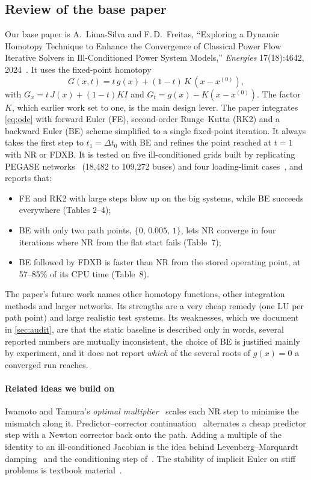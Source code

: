 \documentclass[sigconf,nonacm]{acmart}
\newcommand{\xo}{x^{(0)}}
\begin{document}
\subsection{Review of the base paper}\label{sec:basepaper}
Our base paper is A.~Lima-Silva and F.\,D.~Freitas, ``Exploring a Dynamic Homotopy Technique to Enhance
the Convergence of Classical Power Flow Iterative Solvers in Ill-Conditioned Power System Models,''
\emph{Energies} 17(18):4642, 2024~\cite{lima2024}. It uses the fixed-point homotopy
\begin{equation}
  G(x,t) = t\,g(x) + (1-t)\,K\,(x-\xo), \label{eq:G}
\end{equation}
with $G_x = t\,J(x)+(1-t)KI$ and $G_t = g(x)-K(x-\xo)$. The factor $K$, which earlier work set to one, is
the main design lever. The paper integrates \eqref{eq:ode} with forward Euler (FE), second-order
Runge--Kutta (RK2) and a backward Euler (BE) scheme simplified to a single fixed-point iteration. It
always takes the first step to $t_1=\Delta t_0$ with BE and refines the point reached at $t=1$ with NR or
FDXB. It is tested on five ill-conditioned grids built by replicating PEGASE networks~\cite{pegase}
(18{,}482 to 109{,}272 buses) and four loading-limit cases~\cite{tostado2019ill,tostado2019limit}, and
reports that:
\begin{itemize}
  \item FE and RK2 with large steps blow up on the big systems, while BE succeeds everywhere (Tables 2--4);
  \item BE with only two path points, $\{0,\,0.005,\,1\}$, lets NR converge in four iterations where NR
        from the flat start fails (Table~7);
  \item BE followed by FDXB is faster than NR from the stored operating point, at 57--85\% of its CPU
        time (Table~8).
\end{itemize}
The paper's future work names other homotopy functions, other integration methods and larger networks.
Its strengths are a very cheap remedy (one LU per path point) and large realistic test systems. Its
weaknesses, which we document in \cref{sec:audit}, are that the static baseline is described only in words,
several reported numbers are mutually inconsistent, the choice of BE is justified mainly by experiment, and
it does not report \emph{which} of the several roots of $g(x)=0$ a converged run reaches.

\paragraph{Related ideas we build on}
Iwamoto and Tamura's \emph{optimal multiplier}~\cite{iwamoto1981} scales each NR step to minimise the
mismatch along it. Predictor--corrector continuation~\cite{allgower2003} alternates a cheap predictor step
with a Newton corrector back onto the path. Adding a multiple of the identity to an ill-conditioned
Jacobian is the idea behind Levenberg--Marquardt damping~\cite{levenberg1944,marquardt1963} and the
conditioning step of~\cite{freitas2023}. The stability of implicit Euler on stiff problems is textbook
material~\cite{hairer1996}.
\end{document}
